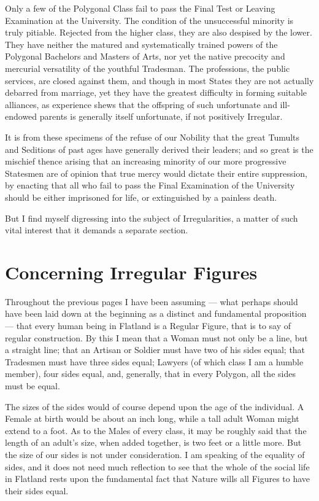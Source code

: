 \documentclass[12pt, a4paper, oneside]{memoir}
\begin{document}
Only a few of the Polygonal Class fail to pass the Final Test or Leaving
Examination at the University. The condition of the unsuccessful minority is
truly pitiable.  Rejected from the higher class, they are also despised by the
lower. They have neither the matured and systematically trained powers of the
Polygonal Bachelors and Masters of Arts, nor yet the native precocity and
mercurial versatility of the youthful Tradesman. The professions, the public
services, are closed against them, and though in most States they are not
actually debarred from marriage, yet they have the greatest difficulty in
forming suitable alliances, as experience shews that the offspring of such
unfortunate and ill-endowed parents is generally itself unfortunate, if not
positively Irregular.

It is from these specimens of the refuse of our Nobility that the great
Tumults and Seditions of past ages have generally derived their leaders; and
so great is the mischief thence arising that an increasing minority of our
more progressive Statesmen are of opinion that true mercy would dictate their
entire suppression, by enacting that all who fail to pass the Final
Examination of the University should be either imprisoned for life, or
extinguished by a painless death.

But I find myself digressing into the subject of Irregularities, a matter of
such vital interest that it demands a separate section.






\chapter{Concerning Irregular Figures}
Throughout the previous pages I have been assuming --- what perhaps should have
been laid down at the beginning as a distinct and fundamental proposition ---
that every human being in Flatland is a Regular Figure, that is to say of
regular construction. By this I mean that a Woman must not only be a line, but
a straight line; that an Artisan or Soldier must have two of his sides equal;
that Tradesmen must have three sides equal; Lawyers (of which class I am a
humble member), four sides equal, and, generally, that in every Polygon, all
the sides must be equal.

The sizes of the sides would of course depend upon the age of the individual.
A Female at birth would be about an inch long, while a tall adult Woman might
extend to a foot. As to the Males of every class, it may be roughly said that
the length of an adult's size, when added together, is two feet or a little
more. But the size of our sides is not under consideration. I am speaking of
the equality of sides, and it does not need much reflection to see that the
whole of the social life in Flatland rests upon the fundamental fact that
Nature wills all Figures to have their sides equal.
\end{document}
